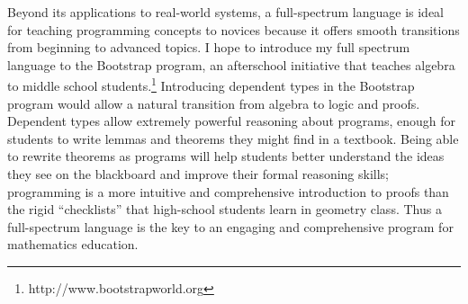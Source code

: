 \documentclass[12pt]{article}
\begin{document}
Beyond its applications to real-world systems, a full-spectrum language is ideal for teaching programming concepts to novices because it offers smooth transitions from beginning to advanced topics.
I hope to introduce my full spectrum language to the Bootstrap program, an afterschool initiative that teaches algebra to middle school students.\footnote{http://www.bootstrapworld.org}
Introducing dependent types in the Bootstrap program would allow a natural transition from algebra to logic and proofs.
Dependent types allow extremely powerful reasoning about programs, enough for students to write lemmas and theorems they might find in a textbook.
Being able to rewrite theorems as programs will help students better understand the ideas they see on the blackboard and improve their formal reasoning skills; programming is a more intuitive and comprehensive introduction to proofs than the rigid ``checklists'' that high-school students learn in geometry class.
Thus a full-spectrum language is the key to an engaging and comprehensive program for mathematics education.

\vfill{}
\renewcommand{\section}[2]{}
\begin{multicols}{2}
\footnotesize


\end{multicols}
\end{document}
